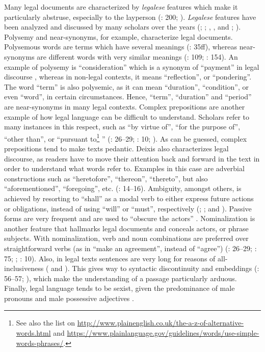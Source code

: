 \documentclass[output=paper]{langscibook}
\begin{document}
Many legal documents are characterized by \textit{legalese} features which make it particularly abstruse, especially to the layperson (\citealt{Tiersma1999}: 200; \citealt{TiersmaSolan2012}). \textit{Legalese} features have been analyzed and discussed by many scholars over the years (\citealt{Bhatia1997}; \citealt{Tiersma1999}; \citealt{Williams2004}, \citealt{Williams2011}, \citealt{Williams2015} and \citealt{Williams2023}; \citealt{Giampieri2021}). Polysemy and near-synonyms, for example, characterize legal documents. Polysemous words are terms which have several meanings (\citealt{AlcarazVaróHughes2002}: 35ff), whereas near-synonyms are different words with very similar meanings (\citealt{Stubbs1996}: 109; \citealt{Philips2003}: 154). An example of polysemy is “consideration” which is a synonym of “payment” in legal discourse \citep[45]{Scott2017}, whereas in non-legal contexts, it means “reflection”, or “pondering”. The word “term” is also polysemic, as it can mean “duration”, “condition”, or even “word”, in certain circumstances. Hence, “term”, “duration” and “period” are near-synonyms in many legal contexts. Complex prepositions are another example of how legal language can be difficult to understand. Scholars refer to many instances in this respect, such as “by virtue of”, “for the purpose of”, “other than”, or “pursuant to\footnote{See also the list on \url{http://www.plainenglish.co.uk/the-a-z-of-alternative-words.html} and \url{https://www.plainlanguage.gov/guidelines/words/use-simple-words-phrases/}.} ” (\citealt{Bhatia2010}: 26–29; \citealt{CoulthardJohnson2010}: 10; \citealt{Mellinkoff2004}). As can be guessed, complex prepositions tend to make texts pedantic. Deixis also characterizes legal discourse, as readers have to move their attention back and forward in the text in order to understand what words refer to. Examples in this case are adverbial constructions such as “heretofore”, “thereon”, “thereto”, but also “aforementioned”, “foregoing”, etc. (\citealt{Abate1998}: 14–16). Ambiguity, amongst others, is achieved by resorting to “shall” as a modal verb to either express future actions or obligations, instead of using “will” or “must”, respectively (\citealt{Tiersma1999}; \citealt{TiersmaSolan2012}; \citealt{Williams2015} and \citealt{Williams2023}). Passive forms are very frequent and are used to “obscure the actors” \citep[75]{Tiersma1999}. Nominalization is another feature that hallmarks legal documents and conceals actors, or phrase subjects. With nominalization, verb and noun combinations are preferred over straightforward verbs (as in “make an agreement”, instead of “agree”) (\citealt{Bhatia2010}: 26–29; \citealt{Tiersma1999}: 75; \citealt{Williams2011}; \citealt{CoulthardJohnson2010}: 10). Also, in legal texts sentences are very long for reasons of all-inclusiveness (\citealt{Williams2004} and \citealt{Williams2015}). This gives way to syntactic discontinuity and embeddings (\citealt{Tiersma1999}: 56–57; \citealt{Williams2015}), which make the understanding of a passage particularly arduous. Finally, legal language tends to be sexist, given the predominance of male pronouns and male possessive adjectives \citep[135]{Griffith1988}.
\end{document}
